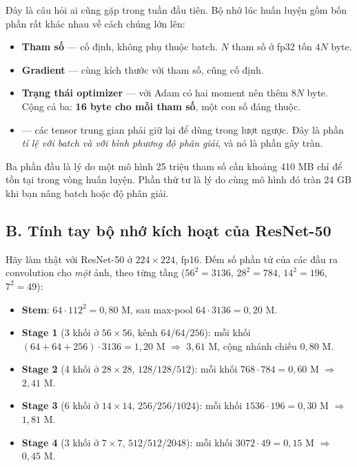 \documentclass[../../deep_learning.tex]{subfiles}
\begin{document}
Đây là câu hỏi ai cũng gặp trong tuần đầu tiên. Bộ nhớ lúc huấn luyện gồm bốn phần rất khác nhau về cách chúng lớn lên:

\begin{itemize}
\item \textbf{Tham số} --- cố định, không phụ thuộc batch. \(N\) tham số ở fp32 tốn \(4N\) byte.
\item \textbf{Gradient} --- cùng kích thước với tham số, cũng cố định.
\item \textbf{Trạng thái optimizer} --- với Adam có hai moment nên thêm \(8N\) byte. Cộng cả ba: \textbf{16 byte cho mỗi tham số}, một con số đáng thuộc.
\item \textbf{} --- các tensor trung gian phải giữ lại để dùng trong lượt ngược. Đây là phần \emph{tỉ lệ với batch và với bình phương độ phân giải}, và nó là phần gây tràn.
\end{itemize}

Ba phần đầu là lý do một mô hình 25 triệu tham số cần khoảng 410 MB chỉ để tồn tại trong vòng huấn luyện. Phần thứ tư là lý do cùng mô hình đó tràn 24 GB khi bạn nâng batch hoặc độ phân giải.

\subsection{B. Tính tay bộ nhớ kích hoạt của ResNet-50}

Hãy làm thật với ResNet-50 ở \(224\times224\), fp16. Đếm số phần tử của các đầu ra convolution cho \emph{một} ảnh, theo từng tầng (\(56^2 = 3136\), \(28^2 = 784\), \(14^2 = 196\), \(7^2 = 49\)):

\begin{itemize}
\item \textbf{Stem}: \(64\cdot112^2 = 0{,}80\) M, sau max-pool \(64\cdot3136 = 0{,}20\) M.
\item \textbf{Stage 1} (3 khối ở \(56\times56\), kênh \(64/64/256\)): mỗi khối \((64{+}64{+}256)\cdot 3136 = 1{,}20\) M \(\Rightarrow\) \(3{,}61\) M, cộng nhánh chiếu \(0{,}80\) M.
\item \textbf{Stage 2} (4 khối ở \(28\times28\), \(128/128/512\)): mỗi khối \(768\cdot 784 = 0{,}60\) M \(\Rightarrow\) \(2{,}41\) M.
\item \textbf{Stage 3} (6 khối ở \(14\times14\), \(256/256/1024\)): mỗi khối \(1536\cdot196 = 0{,}30\) M \(\Rightarrow\) \(1{,}81\) M.
\item \textbf{Stage 4} (3 khối ở \(7\times7\), \(512/512/2048\)): mỗi khối \(3072\cdot49 = 0{,}15\) M \(\Rightarrow\) \(0{,}45\) M.
\end{itemize}
\end{document}
